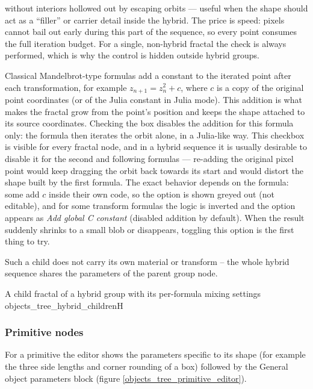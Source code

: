 \begin{description}
	without interiors hollowed out by escaping orbits --- useful when the shape should act as a
	``filler'' or carrier detail inside the hybrid. The price is speed: pixels cannot bail out
	early during this part of the sequence, so every point consumes the full iteration budget.
	For a single, non-hybrid fractal the check is always performed, which is why the control is
	hidden outside hybrid groups.
	\item[Don't add global C constant] Classical Mandelbrot-type formulas add a constant to the
	iterated point after each transformation, for example $z_{n+1} = z_{n}^{2} + c$, where $c$ is
	a copy of the original point coordinates (or of the Julia constant in Julia mode). This
	addition is what makes the fractal grow from the point's position and keeps the shape
	attached to its source coordinates. Checking the box disables the addition for this formula
	only: the formula then iterates the orbit alone, in a Julia-like way. This checkbox is
	visible for every fractal node, and in a hybrid sequence it is usually desirable to disable
	it for the second and following formulas --- re-adding the original pixel point would keep
	dragging the orbit back towards its start and would distort the shape built by the first
	formula. The exact behavior depends on the formula: some add $c$ inside their own code, so
	the option is shown greyed out (not editable), and for some transform formulas the logic is
	inverted and the option appears as \emph{Add global C constant} (disabled addition by
	default). When the result suddenly shrinks to a small blob or disappears, toggling this
	option is the first thing to try.
\end{description}

Such a child does not carry its own material or transform -- the whole hybrid sequence shares
the parameters of the parent group node.

{A child fractal of a hybrid group with its per-formula mixing settings}
{objects_tree_hybrid_children}{H}

\subsubsection{Primitive nodes}

For a primitive the editor shows the parameters specific to its shape (for example the three side
lengths and corner rounding of a box) followed by the General object parameters block (figure
\ref{objects_tree_primitive_editor}).

